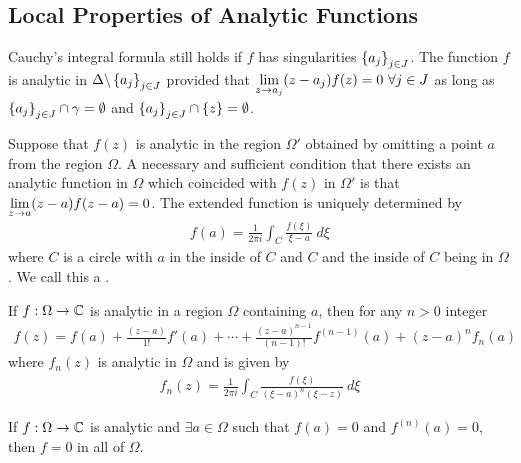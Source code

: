 \subsection{Local Properties of Analytic Functions}

\begin{theorem}
    Cauchy's integral formula still holds if $f$ has singularities
    $\left\{ a_j \right\}_{j \in J}$. The function $f$ is analytic
    in $\Delta \backslash \left\{ a_j \right\}_{j \in J}$ provided that
    $\lim\limits_{z \rightarrow a_j} (z-a_j)f(z) = 0 \ \forall j \in J$ as long as
    $\left\{ a_j \right\}_{j \in J} \cap \gamma = \emptyset$ and
    $\left\{ a_j \right\}_{j \in J} \cap \left\{ z \right\} = \emptyset$.
\end{theorem}

\begin{definition}
    Suppose that $f(z)$ is analytic in the region $\Omega'$ obtained by omitting
    a point $a$ from the region $\Omega$. A necessary and sufficient condition that
    there exists an analytic function in $\Omega$ which coincided with $f(z)$ in
    $\Omega'$ is that $\lim\limits_{z \rightarrow a} (z-a)f(z-a) = 0$. The extended function
    is uniquely determined by
    \begin{align*}
        f(a) = \frac{1}{2 \pi i} \int_C \frac{f(\xi)}{\xi - a} \ d \xi
    \end{align*}
    where $C$ is a circle with $a$ in the inside of $C$ and $C$ and the inside of $C$
    being in $\Omega$. We call this a .
\end{definition}

\begin{theorem}
    If $f: \Omega \rightarrow \mathbb{C}$ is analytic in a region $\Omega$ containing $a$,
    then for any $n>0$ integer
    \begin{align*}
        f(z) = f(a) + \frac{(z-a)}{1!} f'(a) + \dotsb + \frac{(z-a)^{n-1}}{(n-1)!} f^{(n-1)} (a)
            + (z-a)^n f_n (a)
    \end{align*}
    where $f_n(z)$ is analytic in $\Omega$ and is given by
    \begin{align*}
        f_n (z) = \frac{1}{2 \pi i} \int_C \frac{f(\xi)}{(\xi - a)^n (\xi - z)} \ d \xi
    \end{align*}
\end{theorem}

\begin{theorem}
    If $f: \Omega \rightarrow \mathbb{C}$ is analytic and $\exists a \in \Omega$ such that
    $f(a) = 0$ and $f^{(n)} (a) = 0$, then $f = 0$ in all of $\Omega$.
\end{theorem}

